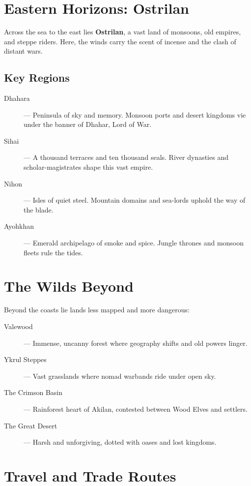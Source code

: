 \section{Eastern Horizons: Ostrilan}

Across the sea to the east lies \textbf{Ostrilan}, a vast land of monsoons, old empires, and steppe riders. Here, the winds carry the scent of incense and the clash of distant wars.

\subsection*{Key Regions}

\begin{description}
  \item[Dhahara] — Peninsula of sky and memory. Monsoon ports and desert kingdoms vie under the banner of Dhahar, Lord of War.
  \item[Sihai] — A thousand terraces and ten thousand seals. River dynasties and scholar-magistrates shape this vast empire.
  \item[Nihon] — Isles of quiet steel. Mountain domains and sea-lords uphold the way of the blade.
  \item[Ayohkhan] — Emerald archipelago of smoke and spice. Jungle thrones and monsoon fleets rule the tides.
\end{description}

\section{The Wilds Beyond}

Beyond the coasts lie lands less mapped and more dangerous:

\begin{description}
  \item[Valewood] — Immense, uncanny forest where geography shifts and old powers linger.
  \item[Ykrul Steppes] — Vast grasslands where nomad warbands ride under open sky.
  \item[The Crimson Basin] — Rainforest heart of Akilan, contested between Wood Elves and settlers.
  \item[The Great Desert] — Harsh and unforgiving, dotted with oases and lost kingdoms.
\end{description}

\section{Travel and Trade Routes}

